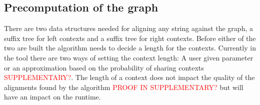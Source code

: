 \documentclass{article}
\begin{document}
\subsection{Precomputation of the graph}
There are two data structures needed for aligning any string against the graph, a suffix tree for left contexts and a suffix tree for right contexts. Before either of the two are built the algorithm needs to decide a length for the contexts. Currently in the tool there are two ways of setting the context length: A user given parameter or an approximation based on the probability of sharing contexts \textcolor{red}{SUPPLEMENTARY?}. The length of a context does not impact the quality of the alignments found by the algorithm \textcolor{red}{PROOF IN SUPPLEMENTARY?} but will have an impact on the runtime.\\
\par\noindent
\end{document}
